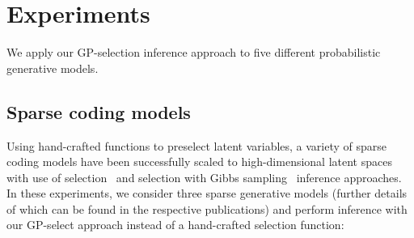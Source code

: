 \section{Experiments}
\label{exps}
%
We apply our GP-selection inference approach to five different probabilistic generative models.

\subsection{Sparse coding models}
Using hand-crafted functions to preselect latent variables, a variety of sparse coding models have been successfully scaled to high-dimensional  latent spaces with use of  selection~\citep{HennigesEtAl2010, BornscheinEtAl2013, SheikhEtAl2014} and selection with Gibbs sampling~\citep{SheltonEtAl2011, SheltonEtAl2012} inference approaches.
In these experiments, we consider three sparse generative models (further details of which can be found in the respective publications) and perform inference with our GP-select approach instead of a hand-crafted selection function:
%

